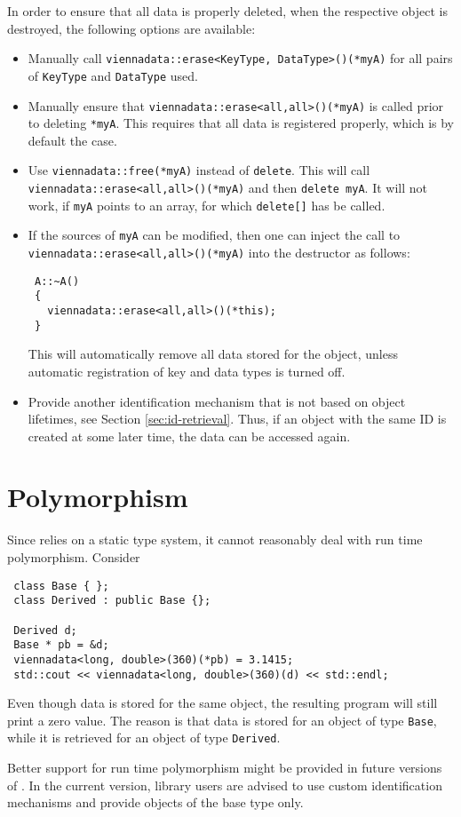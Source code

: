 In order to ensure that all data is properly deleted, when the respective object is destroyed, the following options are available:
\begin{itemize}
 \item Manually call \lstinline|viennadata::erase<KeyType, DataType>()(*myA)| for all pairs of \lstinline|KeyType| and \lstinline|DataType| used.
 \item Manually ensure that \lstinline|viennadata::erase<all,all>()(*myA)| is called prior to deleting \lstinline|*myA|. This requires that all data is registered properly, which is by default the case.
 \item Use \lstinline|viennadata::free(*myA)| instead of \lstinline|delete|. This will call \lstinline|viennadata::erase<all,all>()(*myA)| and then \lstinline|delete myA|.
 It will not work, if \lstinline|myA| points to an array, for which \lstinline|delete[]| has be called.
 \item If the sources of \lstinline|myA| can be modified, then one can inject the call to \lstinline|viennadata::erase<all,all>()(*myA)| into the destructor as follows:
\begin{lstlisting}
 A::~A()
 {
   viennadata::erase<all,all>()(*this);
 }
\end{lstlisting}
This will automatically remove all data stored for the object, unless automatic registration of key and data types is turned off.
 \item Provide another identification mechanism that is not based on object lifetimes, see Section \ref{sec:id-retrieval}. Thus, if an object with the same ID is created at some later time, the data can be accessed again.
\end{itemize}


\section{Polymorphism}
Since {\ViennaData} relies on a static type system, it cannot reasonably deal with run time polymorphism. Consider
\begin{lstlisting}
 class Base { };
 class Derived : public Base {};

 Derived d;
 Base * pb = &d;
 viennadata<long, double>(360)(*pb) = 3.1415;
 std::cout << viennadata<long, double>(360)(d) << std::endl;
\end{lstlisting}
Even though data is stored for the same object, the resulting program will still print a zero value.
The reason is that data is stored for an object of type \lstinline|Base|, while it is retrieved for an object of type \lstinline|Derived|.

Better support for run time polymorphism might be provided in future versions of {\ViennaData}. In the current version, library users are advised to use custom identification mechanisms and provide objects of the base type only.


